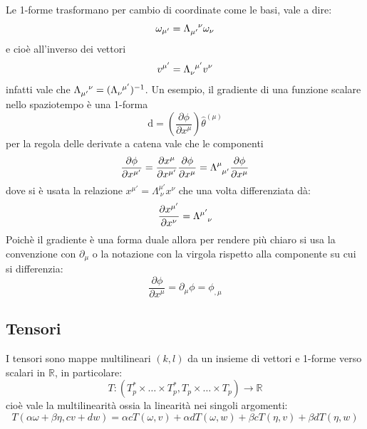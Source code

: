 \documentclass[twoside]{article}
\begin{document}
Le 1-forme trasformano per cambio di coordinate come le basi, vale a dire:
\begin{equation}
	\omega_{\mu'} = \Lambda\indices{_{\mu'}^\nu} \omega_\nu
\end{equation}
e cioè all'inverso dei vettori
\begin{equation}
	v^{\mu'} = \Lambda\indices{_\nu^{\mu'}} v^\nu
\end{equation}
infatti vale che $\Lambda\indices{_{\mu'}^\nu} = (\Lambda\indices{_\nu^{\mu'}})^{-1}$.
Un esempio, il gradiente di una funzione scalare nello spaziotempo è una 1-forma
\begin{equation}
	\textrm{d} = \left(\dfrac{\partial \phi}{\partial x^{\mu}} \right) \hat{\theta}^{(\mu)}
\end{equation}
per la regola delle derivate a catena vale che le componenti 
\begin{equation}
	\dfrac{\partial \phi}{\partial x^{\mu'}} = \dfrac{\partial x^\mu}{\partial x^{\mu'}}\dfrac{\partial \phi}{\partial x^\mu} = \Lambda\indices{^\mu_{\mu'}} \dfrac{\partial \phi}{\partial x^{\mu}}
\end{equation}
dove si è usata la relazione $x^{\mu'} = \Lambda^{\mu'}_{\ \nu} x^\nu$ che una volta differenziata dà:
$$
\dfrac{\partial x^{\mu'}}{\partial x^\nu} = \Lambda\indices{^{\mu'}_{\nu}}
$$
Poichè il gradiente è una forma duale allora per rendere più chiaro si usa la convenzione con $\partial_\mu$ o la notazione con la virgola rispetto alla componente su cui si differenzia:
\begin{equation}
	\dfrac{\partial \phi}{\partial x^{\mu}} = \partial_{\mu}\phi = \phi_{,\mu}
\end{equation}


\subsection{Tensori}
I tensori sono mappe multilineari $(k,l)$ da un insieme di vettori e 1-forme verso scalari in $\mathbb{R}$, in particolare:
\begin{equation}
	T : (T_p^* \times \ldots \times T_p^* , T_p \times \ldots \times T_p ) \rightarrow \mathbb{R}
\end{equation}
cioè vale la multilinearità ossia la linearità nei singoli argomenti:
\begin{equation}
	T(\alpha \omega + \beta \eta, c v + d w ) = \alpha c T(\omega,v) + \alpha d T(\omega,w) + \beta c T(\eta,v) + \beta d T(\eta,w)
\end{equation}
\end{document}
